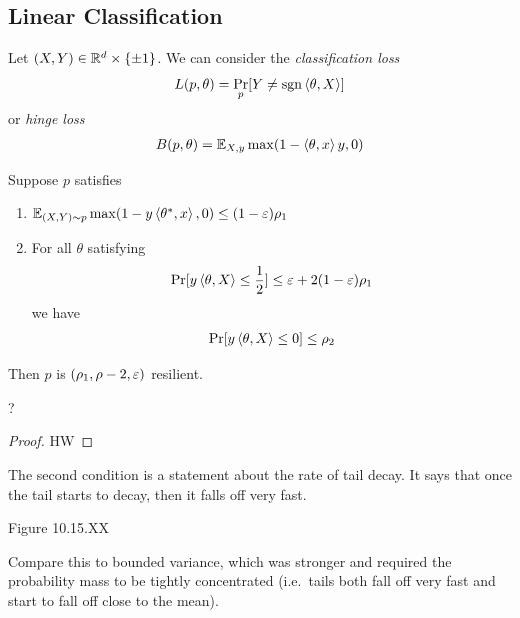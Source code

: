 \subsection{Linear Classification}

Let $(X,Y) \in \mathbb{R}^d \times \{\pm 1\}$. We can consider the
\emph{classification loss}
\begin{align}
  L(p, \theta) = \Pr_p[Y \neq \operatorname{sgn}\braket{\theta, X}]
\end{align}
or \emph{hinge loss}
\begin{align}
  B(p, \theta) = \mathbb{E}_{X, y} \max(1 - \braket{\theta, x}y, 0)
\end{align}

\begin{proposition}
  Suppose $p$ satisfies
  \begin{enumerate}
    \item $\mathbb{E}_{(X,Y) \sim p} \max (1 - y \braket{\theta^*, x}, 0) \leq (1 - \varepsilon) \rho_1$
    \item For all $\theta$ satisfying
      \begin{align}
        \Pr[y \braket{\theta, X} \leq \frac{1}{2}] \leq \varepsilon + 2(1-\varepsilon) \rho_1
      \end{align}
      we have
      \begin{align}
        \Pr[y \braket{\theta, X} \leq 0] \leq \rho_2
      \end{align}
  \end{enumerate}
  Then $p$ is $(\rho_1, \rho-2, \varepsilon)$ resilient.
\end{proposition}
?

\begin{proof}
  HW 
\end{proof}

\begin{remark}
  The second condition is a statement about the rate of tail decay.
  It says that once the tail starts to decay, then it falls off very fast.

  Figure 10.15.XX

  Compare this to bounded variance, which was stronger and required the probability
  mass to be tightly concentrated (i.e.\ tails both fall off very fast and start
  to fall off close to the mean).
\end{remark}
